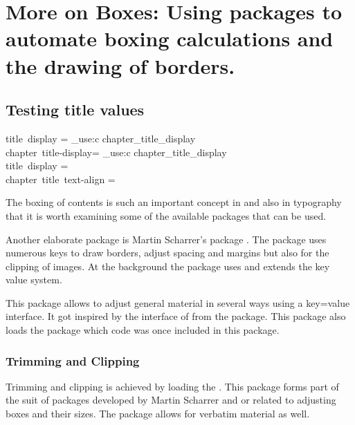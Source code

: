 \chapter{More on Boxes: Using packages to automate boxing calculations and the drawing of borders.}
\thispagestyle{plain}
\pagestyle{headings}
\large

\section{Testing title values}
\makeatletter
\ExplSyntaxOn
title~display = \int_use:c {chapter_title_display} \\
chapter~title-display= \int_use:c {chapter_title_display} \\
title~display =\meaning\titledisplay@cx\\
chapter~title~text-align = \meaning\chaptertitletextalign@cx\\
\meaning\chaptertitletextalign@cx
\makeatother
\ExplSyntaxOff

The boxing of contents is such an important concept in \tex and also in typography that it is worth examining some of the available packages that can be used.

Another elaborate package is Martin Scharrer’s package . The package uses numerous keys
to draw borders, adjust spacing and margins but also for the clipping of images. At the background the package uses and extends the  key value system.

This package allows to adjust general \latexe material in several ways using a key=value interface.
It got inspired by the interface of  from the  package.
 This package also loads the  package which code was once included in this package.


 \subsection{Trimming and Clipping}
 
 Trimming and clipping is achieved by loading the . This package forms part of the suit of packages developed by Martin Scharrer and or related to adjusting boxes and their sizes. The package allows for
 verbatim material as well. 
 
